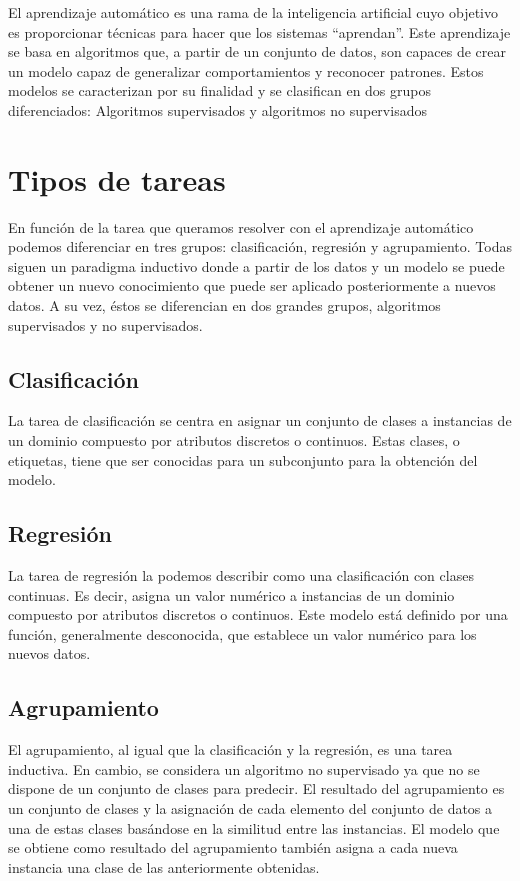 El aprendizaje automático es una rama de la inteligencia artificial cuyo objetivo es proporcionar técnicas para hacer que los sistemas “aprendan”. Este aprendizaje se basa en algoritmos que, a partir de un conjunto de datos, son capaces de crear un modelo capaz de generalizar comportamientos y reconocer patrones. Estos modelos se caracterizan por su finalidad y se clasifican en dos grupos diferenciados: Algoritmos supervisados y algoritmos no supervisados

\section{Tipos de tareas}
En función de la tarea que queramos resolver con el aprendizaje automático podemos diferenciar en tres grupos: clasificación, regresión y agrupamiento. Todas siguen un paradigma inductivo donde a partir de los datos y un modelo se puede obtener un nuevo conocimiento que puede ser aplicado posteriormente a nuevos datos. A su vez, éstos se diferencian en dos grandes grupos, algoritmos supervisados y no supervisados. 

\subsection{Clasificación}
La tarea de clasificación se centra en asignar un conjunto de clases a instancias de un dominio compuesto por atributos discretos o continuos. Estas clases, o etiquetas, tiene que ser conocidas para un subconjunto para la obtención del modelo.

\subsection{Regresión}
La tarea de regresión la podemos describir como una clasificación con clases continuas. Es decir, asigna un valor numérico a instancias de un dominio compuesto por atributos discretos o continuos. Este modelo está definido por una función, generalmente desconocida, que establece un valor numérico para los nuevos datos.

\subsection{Agrupamiento}
El agrupamiento, al igual que la clasificación y la regresión, es una tarea inductiva. En cambio, se considera un algoritmo no supervisado ya que no se dispone de un conjunto de clases para predecir. El resultado del agrupamiento es un conjunto de clases y la asignación de cada elemento del conjunto de datos a una de estas clases basándose en la similitud entre las instancias. El modelo que se obtiene como resultado del agrupamiento también asigna a cada nueva instancia una clase de las anteriormente obtenidas.

